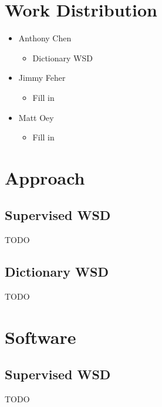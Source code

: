\documentclass[11pt]{article}
\begin{document}
\lstset{language=Python}
\setlength{\parindent}{0in}
\addtolength{\parskip}{0.1cm}
\setlength{\fboxrule}{.5mm}\setlength{\fboxsep}{1.2mm}
\newlength{\boxlength}\setlength{\boxlength}{\textwidth}
\addtolength{\boxlength}{-4mm}

\begin{center}
\end{center}

\section{Work Distribution}
\begin{itemize}
    \item Anthony Chen 
        \begin{itemize}
            \item Dictionary WSD
        \end{itemize}    
    \item Jimmy Feher
        \begin{itemize}
            \item Fill in
        \end{itemize}  
    \item Matt Oey
        \begin{itemize}
            \item Fill in
        \end{itemize}  
\end{itemize}

\section{Approach}
\subsection{Supervised WSD}
TODO
\subsection{Dictionary WSD}
TODO


\section{Software}
\subsection{Supervised WSD}
TODO
\end{document}

